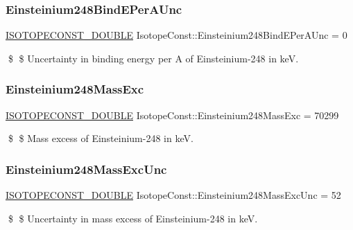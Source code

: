 \subsubsection{\texorpdfstring{Einsteinium248\+Bind\+E\+Per\+A\+Unc}{Einsteinium248BindEPerAUnc}}
{\footnotesize\ttfamily \mbox{\hyperlink{group___isotope_const-_macros_ga8f45a7272ce02c0b4c65c44636ed719a}{I\+S\+O\+T\+O\+P\+E\+C\+O\+N\+S\+T\+\_\+\+D\+O\+U\+B\+LE}} Isotope\+Const\+::\+Einsteinium248\+Bind\+E\+Per\+A\+Unc = 0}

\$ \$ Uncertainty in binding energy per A of Einsteinium-\/248 in keV. \mbox{\label{group___isotope_const-_einsteinium-_es248_gae077618c057de0d9c5c8611e05f1beb6}} 
\subsubsection{\texorpdfstring{Einsteinium248\+Mass\+Exc}{Einsteinium248MassExc}}
{\footnotesize\ttfamily \mbox{\hyperlink{group___isotope_const-_macros_ga8f45a7272ce02c0b4c65c44636ed719a}{I\+S\+O\+T\+O\+P\+E\+C\+O\+N\+S\+T\+\_\+\+D\+O\+U\+B\+LE}} Isotope\+Const\+::\+Einsteinium248\+Mass\+Exc = 70299}

\$ \$ Mass excess of Einsteinium-\/248 in keV. \mbox{\label{group___isotope_const-_einsteinium-_es248_ga6f9b0f0e414f27f621b26f754d256646}} 
\subsubsection{\texorpdfstring{Einsteinium248\+Mass\+Exc\+Unc}{Einsteinium248MassExcUnc}}
{\footnotesize\ttfamily \mbox{\hyperlink{group___isotope_const-_macros_ga8f45a7272ce02c0b4c65c44636ed719a}{I\+S\+O\+T\+O\+P\+E\+C\+O\+N\+S\+T\+\_\+\+D\+O\+U\+B\+LE}} Isotope\+Const\+::\+Einsteinium248\+Mass\+Exc\+Unc = 52}

\$ \$ Uncertainty in mass excess of Einsteinium-\/248 in keV. \mbox{\label{group___isotope_const-_einsteinium-_es248_ga819cc5ebeba9fe30ba040a253e787a6e}} 
